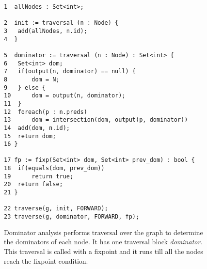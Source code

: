 \begin{figure}[ht!]
\centering
\begin{lstlisting}
1  allNodes : Set<int>;

2  init := traversal (n : Node) { 
3	add(allNodes, n.id);
4  }

5  dominator := traversal (n : Node) : Set<int> { 
6 	Set<int> dom;
7	if(output(n, dominator) == null) {
8		dom = N;
9	} else {
10		dom = output(n, dominator);
11	}
12	foreach(p : n.preds) 
13		dom = intersection(dom, output(p, dominator)) 
14	add(dom, n.id); 
15	return dom; 
16 } 

17 fp := fixp(Set<int> dom, Set<int> prev_dom) : bool {
18	if(equals(dom, prev_dom))
19		return true;
20	return false;
21 }

22 traverse(g, init, FORWARD); 
23 traverse(g, dominator, FORWARD, fp); 				
\end{lstlisting}
\caption{Dominator analysis performs traversal over the graph to determine the dominators of each node. It has one traversal block \textit{dominator}. This traversal is called with a fixpoint and it runs till all the nodes reach the fixpoint condition.}
\label{fig:dominator}
\end{figure}


